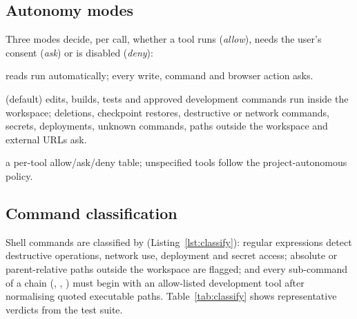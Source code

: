 \documentclass[11pt,a4paper]{article}
\newcommand{\code}[1]{\texttt{\detokenize{#1}}}
\begin{document}
\subsection{Autonomy modes}\label{sec:modes}
Three modes decide, per call, whether a tool runs (\emph{allow}), needs the user's consent (\emph{ask}) or is disabled (\emph{deny}):
\begin{description}[nosep]
  \item[Supervised] reads run automatically; every write, command and browser action asks.
  \item[Project autonomous] (default) edits, builds, tests and approved development commands run inside the workspace; deletions, checkpoint restores, destructive or network
  commands, secrets, deployments, unknown commands, paths outside the workspace and external URLs ask.
  \item[Custom] a per-tool allow/ask/deny table; unspecified tools follow the project-autonomous policy.
\end{description}


\subsection{Command classification}
Shell commands are classified by \code{classify_command} (Listing~\ref{lst:classify}): regular expressions detect destructive operations, network use, deployment and secret access; absolute or parent-relative
paths outside the workspace are flagged; and every sub-command of a chain (\code{&&}, \code{;}, \code{|}) must begin with an allow-listed development tool
after normalising quoted executable paths. Table~\ref{tab:classify} shows representative verdicts from the test suite.

\end{document}
